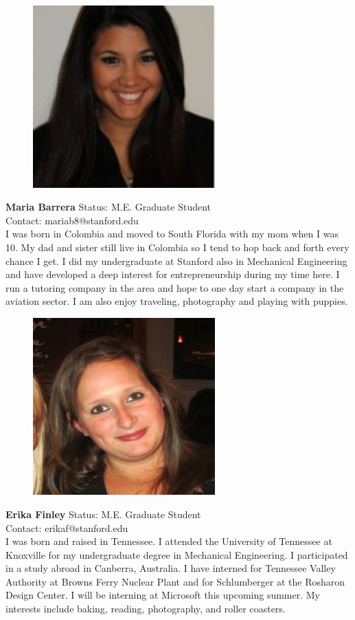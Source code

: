 \begin{figure}[h]
  \centering
     \includegraphics[width=7cm]{images/image011.jpg}
  \label{fig:11}
\end{figure}

\textbf{Maria Barrera}
Status: M.E. Graduate Student \\
Contact: mariab8@stanford.edu \\
I was born in Colombia and moved to South Florida with my mom when I was 10. My dad and sister still live in Colombia so I tend to hop back and forth every chance I get. I did my undergraduate at Stanford also in Mechanical Engineering and have developed a deep interest for entrepreneurship during my time here. I run a tutoring company in the area and hope to one day start a company in the aviation sector. I am also enjoy traveling, photography and playing with puppies.

\begin{figure}[h]
  \centering
     \includegraphics[width=7cm]{images/image012}
  \label{fig:12}
\end{figure}

\textbf{Erika Finley}
Status: M.E. Graduate Student \\
Contact: erikaf@stanford.edu \\
I was born and raised in Tennessee. I attended the University of Tennessee at Knoxville for my undergraduate degree in Mechanical Engineering.  I participated in a study abroad in Canberra, Australia.  I have interned for Tennessee Valley Authority at Browns Ferry Nuclear Plant and for Schlumberger at the Rosharon Design Center. I will be interning at Microsoft this upcoming summer. My interests include baking, reading, photography, and roller coasters.  

